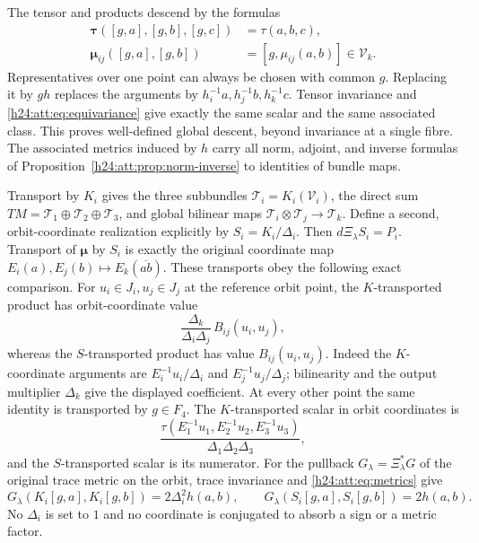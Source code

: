 The tensor and products descend by the formulas
\begin{align}
 \boldsymbol\tau([g,a],[g,b],[g,c])&=\tau(a,b,c),\nonumber\\
 \boldsymbol\mu_{ij}([g,a],[g,b])&=[g,\mu_{ij}(a,b)]
                                  \in\mathcal V_k.
 \label{h24:att:eq:descent}
\end{align}
Representatives over one point can always be chosen with common $g$.
Replacing it by $gh$ replaces the arguments by
$h_i^{-1}a,h_j^{-1}b,h_k^{-1}c$.
Tensor invariance and \eqref{h24:att:eq:equivariance} give exactly the
same scalar and the same associated class. This proves well-defined
global descent, beyond invariance at a single fibre. The associated
metrics induced by $h$ carry all norm, adjoint, and inverse formulas
of Proposition~\ref{h24:att:prop:norm-inverse} to identities of bundle maps.

Transport by $K_i$ gives the three subbundles
$\mathcal T_i=K_i(\mathcal V_i)$, the direct sum
$TM=\mathcal T_1\oplus\mathcal T_2\oplus\mathcal T_3$, and global
bilinear maps $\mathcal T_i\otimes\mathcal T_j\to\mathcal T_k$.
Define a second, orbit-coordinate realization explicitly by
$S_i=K_i/\Delta_i$. Then $d\Xi_\lambda S_i=P_i$.
Transport of $\boldsymbol\mu$ by $S_i$ is exactly the original
coordinate map $E_i(a),E_j(b)\mapsto E_k(\overline{ab})$.
These transports obey the following exact comparison. For
$u_i\in J_i,u_j\in J_j$ at the reference orbit point, the
$K$-transported product has orbit-coordinate value
\begin{equation}
 \frac{\Delta_k}{\Delta_i\Delta_j}\,B_{ij}(u_i,u_j),
 \label{h24:att:eq:tangent-scale-products}
\end{equation}
whereas the $S$-transported product has value $B_{ij}(u_i,u_j)$.
Indeed the $K$-coordinate arguments are
$E_i^{-1}u_i/\Delta_i$ and $E_j^{-1}u_j/\Delta_j$; bilinearity and
the output multiplier $\Delta_k$ give the displayed coefficient.
At every other point the same identity is transported by $g\in F_4$.
The $K$-transported scalar in orbit coordinates is
\[
 \frac{\tau(E_1^{-1}u_1,E_2^{-1}u_2,E_3^{-1}u_3)}
             {\Delta_1\Delta_2\Delta_3},
\]
and the $S$-transported scalar is its numerator.
For the pullback $G_\lambda=\Xi_\lambda^*G$ of the original trace
metric on the orbit, trace invariance and \eqref{h24:att:eq:metrics} give
\[
 G_\lambda(K_i[g,a],K_i[g,b])=2\Delta_i^2h(a,b),\qquad
 G_\lambda(S_i[g,a],S_i[g,b])=2h(a,b).
\]
No $\Delta_i$ is set to $1$ and no coordinate is conjugated to absorb
a sign or a metric factor.

